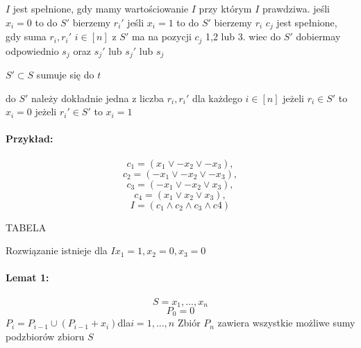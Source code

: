 $I$ jest spełnione, gdy mamy wartościowanie $I$ przy którym $I$ prawdziwa.
jeśli $x_i=0$ to do $S'$ bierzemy $r_i'$
jeśli $x_i=1$ to do $S'$ bierzemy $r_i$
$c_j$ jest spełnione, gdy suma $r_i, r_i'$  $i \in [n]$ z $S'$ ma na pozycji $c_j$  1,2 lub 3. wiec do $S'$ dobiermay odpowiednio $s_j$ oraz $s_j'$ lub $s_j'$ lub $s_j$
 
$S' \subset S$ sumuje się do $t$

do $S'$ należy dokładnie jedna z liczba $r_i, r_i'$ dla każdego $i \in [n]$
jeżeli $r_i  \in S'$ to $x_i = 0$
jeżeli $r_i' \in S'$ to $x_i = 1$

\paragraph{Przykład: }{
$$c_1=(x_1 \lor -x_2 \lor -x_3), $$
$$c_2=(-x_1 \lor -x_2 \lor -x_3),$$ 
$$c_3=(-x_1 \lor -x_2 \lor x_3), $$
$$c_4=(x_1 \lor x_2 \lor x_3),$$ 
$$I = (c_1 \land c_2 \land c_3 \land c4)$$
}

TABELA

Rozwiązanie istnieje dla $I  x_1=1 , x_2=0, x_3=0$

\paragraph{Lemat 1:}
$$S={x_1, ..., x_n}$$
$$P_0 = {0}$$
$P_i = P_{i-1} \cup (P_{i-1} + x_i) $dla$ i=1, ..., n $
Zbiór $P_n$ zawiera wszystkie możliwe sumy podzbiorów zbioru $S$

